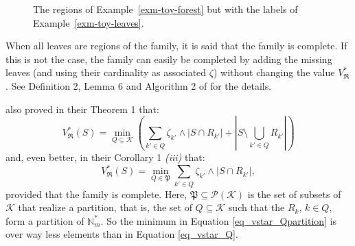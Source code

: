 \documentclass[
  11pt,
  a4paper,
]{article}
\theoremstyle{plain}
\theoremstyle{plain}
\theoremstyle{plain}
\theoremstyle{definition}
\theoremstyle{definition}
\theoremstyle{remark}
\begin{document}
\begin{figure}


\caption{\label{fig-leaves-exm}The regions of
Example~\ref{exm-toy-forest} but with the labels of
Example~\ref{exm-toy-leaves}.}

\end{figure}%

When all leaves are regions of the family, it is said that the family is
complete. If this is not the case, the family can easily be completed by
adding the missing leaves (and using their cardinality as associated
\(\zeta\)) without changing the value \(V^*_{\mathfrak{R}}\). See
Definition 2, Lemma 6 and Algorithm 2 of \citet{MR4178188} for the
details.

\citet{MR4178188} also proved in their Theorem 1 that: \begin{equation}
V^*_{\mathfrak{R}}(S)=\min_{Q\subseteq\mathcal{K}}\left(\sum_{k'\in Q}\zeta_{k'}\wedge|S\cap R_{k'}|+\left| S\setminus\bigcup_{k'\in Q} R_{k'}   \right|\right)
\label{eq_vstar_Q} 
\end{equation} and, even better, in their Corollary 1 \emph{(iii)} that:
\begin{equation}
V^*_{\mathfrak{R}}(S) = \min_{Q\in \mathfrak P}\sum_{k'\in Q}\zeta_{k'}\wedge|S\cap R_{k'}|,
\label{eq_vstar_Qpartition}
\end{equation} provided that the family is complete. Here,
\(\mathfrak P \subseteq \mathcal P(\mathcal{K})\) is the set of subsets
of \(\mathcal{K}\) that realize a partition, that is, the set of
\(Q\subseteq\mathcal{K}\) such that the \(R_k\), \(k\in Q\), form a
partition of \(\mathbb{N}_m^*\). So the minimum in Equation
\eqref{eq_vstar_Qpartition} is over way less elements than in Equation
\eqref{eq_vstar_Q}.
\end{document}
